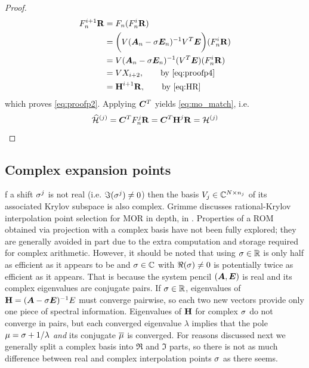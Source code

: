 \begin{proof}
\begin{align*}
F_n^{i+1} \textbf{\textup{R}} &= F_n(F_n^i \textbf{\textup{R}}) \\
&= \bigg( V(\bm{A}_n-\sigma \bm{E}_n)^{-1}V^T \bm{E} \bigg) (F_n^i \textbf{\textup{R}}) \\
&= V  (\bm{A}_n-\sigma \bm{E}_n)^{-1} (V^T \bm{E}) (F_n^i \textbf{\textup{R}})\\
&= V X_{i+2}, \qquad\text{by \eqref{eq:proofp4}}\\
&= \textbf{\textup{H}}^{i+1} \textbf{\textup{R}}, \qquad\text{by \eqref{eq:HR}}
\end{align*}
which proves \eqref{eq:proofp2}.   Applying $\bm{C}^T$ yields \eqref{eq:mo_match}, i.e.
\[
\widehat{\mathcal{H}}^{(j)} = \bm{C}^T F^j_n \textbf{\textup{R}} = \bm{C}^T \textbf{\textup{H}}^j \textbf{\textup{R}} = \mathcal{H}^{(j)}
\] 
\end{proof}

\clearpage
\subsection{Complex expansion points}\label{sec:complex_points}
 f a shift $\sigma^j$ is not real (i.e. $\Im(\sigma^j)\neq 0$) then the basis $V_j\in \mathbb{C}^{N\times n_j}$ of its associated Krylov subspace is also complex.  Grimme discusses  rational-Krylov  interpolation point selection for MOR in depth, in \cite{grimme1998rational}.  Properties of a ROM obtained via projection with a complex basis have not been fully explored; they are generally avoided in part due to the extra computation and storage required for complex arithmetic.    However, it should be noted that using $\sigma\in\mathbb{R}$ is only half as efficient as it appears to be and $\sigma\in\mathbb{C}$ with $\Re(\sigma)\neq 0$ is potentially twice as efficient as it appears.  That is because the system pencil $(\bm{A},\bm{E})$ is real and its complex eigenvalues are conjugate pairs.  If $\sigma\in\mathbb{R}$, eigenvalues of $\textbf{\textup{H}}=(\bm{A}-\sigma \bm{E})^{-1}E$ must converge pairwise, so each two new vectors provide only one piece of spectral information.   Eigenvalues of $\textbf{\textup{H}}$ for complex $\sigma$ do not converge in pairs, but each converged eigenvalue $\lambda$ implies that the pole $\mu = \sigma+ 1/\lambda$ \emph{and} its conjugate $\overline{\mu}$ is converged.   For reasons discussed next we generally split a complex basis into $\Re$ and $\Im$ parts, so there is not as much difference between real and complex interpolation points $\sigma$ as there seems.


